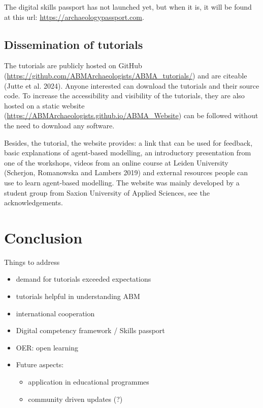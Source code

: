\documentclass[
]{article}
\begin{document}
The digital skills passport has not launched yet, but when it is, it will be found at this url: \url{https://archaeologypassport.com}.

\hypertarget{dissemination-of-tutorials}{%
\subsection{Dissemination of tutorials}\label{dissemination-of-tutorials}}

The tutorials are publicly hosted on GitHub (\url{https://github.com/ABMArchaeologists/ABMA_tutorials/}) and are citeable (Jutte et al. 2024). Anyone interested can download the tutorials and their source code. To increase the accessibility and visibility of the tutorials, they are also hosted on a static website (\href{https://ABMArchaeologists.github.io/ABMA_Website/\#/}{https://ABMArchaeologists.github.io/ABMA\_Website}) can be followed without the need to download any software.

Besides, the tutorial, the website provides: a link that can be used for feedback, basic explanations of agent-based modelling, an introductory presentation from one of the workshops, videos from an online course at Leiden University (Scherjon, Romanowska and Lambers 2019) and external resources people can use to learn agent-based modelling. The website was mainly developed by a student group from Saxion University of Applied Sciences, see the acknowledgements.

\hypertarget{conclusion}{%
\section{Conclusion}\label{conclusion}}

Things to address

\begin{itemize}
\item
  demand for tutorials exceeded expectations
\item
  tutorials helpful in understanding ABM
\item
  international cooperation
\item
  Digital competency framework / Skills passport
\item
  OER: open learning
\item
  Future aspects:

  \begin{itemize}
  \item
    application in educational programmes
  \item
    community driven updates (?)
  \end{itemize}
\end{itemize}
\end{document}
